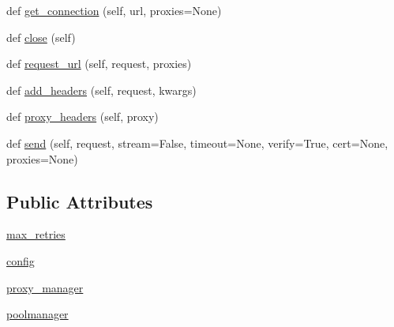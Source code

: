 \begin{DoxyCompactItemize}
\item 
def \hyperlink{classpip_1_1__vendor_1_1requests_1_1adapters_1_1HTTPAdapter_aa378d84f3fc4067c3bbe88ebc8304f9b}{get\+\_\+connection} (self, url, proxies=None)
\item 
def \hyperlink{classpip_1_1__vendor_1_1requests_1_1adapters_1_1HTTPAdapter_a0540e50f88f63545aa6ff41f238a939e}{close} (self)
\item 
def \hyperlink{classpip_1_1__vendor_1_1requests_1_1adapters_1_1HTTPAdapter_aada71ac3613d6c3fcdc7e2049d49854e}{request\+\_\+url} (self, request, proxies)
\item 
def \hyperlink{classpip_1_1__vendor_1_1requests_1_1adapters_1_1HTTPAdapter_a7d90fba8580b3f96dd51b0858c120329}{add\+\_\+headers} (self, request, kwargs)
\item 
def \hyperlink{classpip_1_1__vendor_1_1requests_1_1adapters_1_1HTTPAdapter_a10a2069cfdc982d7d30efcf8327e27e6}{proxy\+\_\+headers} (self, proxy)
\item 
def \hyperlink{classpip_1_1__vendor_1_1requests_1_1adapters_1_1HTTPAdapter_a6b8cb9b4129cbc1c9aa685dc69f869a4}{send} (self, request, stream=False, timeout=None, verify=True, cert=None, proxies=None)
\end{DoxyCompactItemize}
\subsection*{Public Attributes}
\begin{DoxyCompactItemize}
\item 
\hyperlink{classpip_1_1__vendor_1_1requests_1_1adapters_1_1HTTPAdapter_a1890f4528c843662658f580eb7f541cd}{max\+\_\+retries}
\item 
\hyperlink{classpip_1_1__vendor_1_1requests_1_1adapters_1_1HTTPAdapter_afdfc57f02baf1870912e8da649f99415}{config}
\item 
\hyperlink{classpip_1_1__vendor_1_1requests_1_1adapters_1_1HTTPAdapter_a4ee5fc396453b4236848f14cce9a9099}{proxy\+\_\+manager}
\item 
\hyperlink{classpip_1_1__vendor_1_1requests_1_1adapters_1_1HTTPAdapter_addf767ae1a4a21d920ab3e0680214496}{poolmanager}
\end{DoxyCompactItemize}


